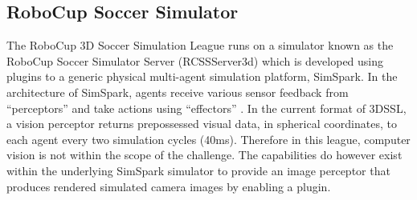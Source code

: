 \documentclass[a4paper,twoside,12pt]{report}
\begin{document}
\subsection{RoboCup Soccer Simulator}

The RoboCup 3D Soccer Simulation League runs on a simulator known as the RoboCup Soccer Simulator Server (RCSSServer3d) which is developed using plugins to a generic physical multi-agent simulation platform, SimSpark. In the architecture of SimSpark, agents receive various sensor feedback from ``perceptors'' and take actions using ``effectors'' \citep{simspark}. In the current format of 3DSSL, a vision perceptor returns prepossessed visual data, in spherical coordinates, to each agent every two simulation cycles (40ms). Therefore in this league, computer vision is not within the scope of the challenge. The capabilities do however exist within the underlying SimSpark simulator to provide an image perceptor that produces rendered simulated camera images by enabling a plugin.
\end{document}
